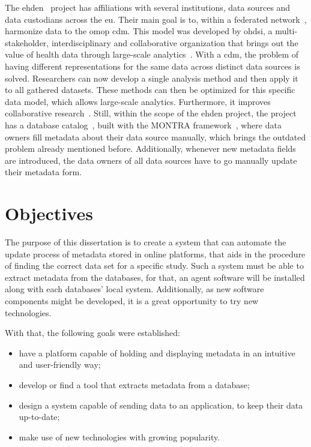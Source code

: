 The \gls{ehden}~\cite{ehden} project has affiliations with several institutions, data sources and data custodians across the \gls{eu}.
Their main goal is to, within a federated network~\cite{ehden-datapartners}, harmonize data to the \gls{omop} \gls{cdm}.
This model was developed by \gls{ohdsi}, a multi-stakeholder, interdisciplinary and collaborative organization that brings out the value of health data through large-scale analytics~\cite{ohdsi-site}.
With a \gls{cdm}, the problem of having different representations for the same data
across distinct data sources is solved.
Researchers can now develop a single analysis method and then apply it to all gathered
datasets.
These methods can then be optimized for this specific data model, which allows
large-scale analytics.
Furthermore, it improves collaborative research~\cite{ohdsi-site}.
Still, within the scope of the \gls{ehden} project, the project has a database catalog~\cite{ehden-portal},
built with the MONTRA framework~\cite{montra}, where data owners fill metadata about
their data source manually, which brings the outdated problem already mentioned before.
Additionally, whenever new metadata fields are introduced, the data owners of all data
sources have to go manually update their metadata form.

\section{Objectives}
The purpose of this dissertation is to create a system that can automate the update process of metadata stored in online platforms, that aids in the procedure of finding the correct data set for a specific study.
Such a system must be able to extract metadata from the databases, for that, an agent software will be installed along with each databases' local system.
Additionally, as new software components might be developed, it is a great opportunity to try new technologies.

With that, the following goals were established:
\begin{itemize}
    \item have a platform capable of holding and displaying metadata in an intuitive and user-friendly way;
    \item develop or find a tool that extracts metadata from a database;
    \item design a system capable of sending data to an application, to keep their data up-to-date;
    \item make use of new technologies with growing popularity.
\end{itemize}

